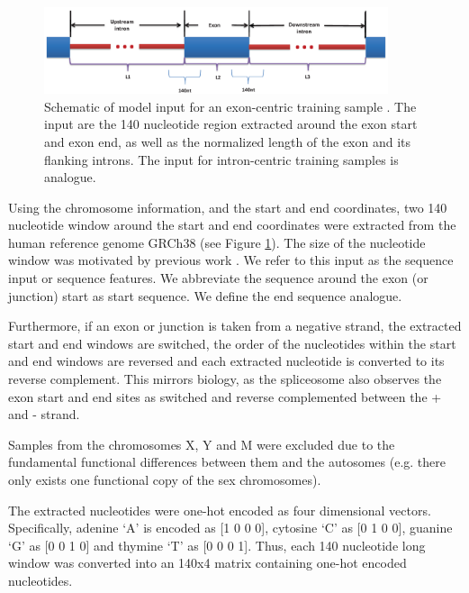 \begin{figure}
	\centering\includegraphics[width=0.9\textwidth]{../visualizations/ch4-methods/input_schematic.png} 
	\caption{Schematic of model input for an exon-centric training sample \cite{dsc}. The input are the 140 nucleotide region extracted around the exon start and exon end, as well as the normalized length of the exon and its flanking introns. The input for intron-centric training samples is analogue.}
	\label{fig:inputschematic}
\end{figure}

Using the chromosome information, and the start and end coordinates, two 140 nucleotide window around the start and end coordinates were extracted from the human reference genome GRCh38 (see Figure \ref{fig:inputschematic}). The size of the nucleotide window was motivated by previous work \cite{dsc}. We refer to this input as the sequence input or sequence features. We abbreviate the sequence around the exon (or junction) start as start sequence. We define the end sequence analogue. 

Furthermore, if an exon or junction is taken from a negative strand, the extracted start and end windows are switched, the order of the nucleotides within the start and end windows are reversed and each extracted nucleotide is converted to its reverse complement. This mirrors biology, as the spliceosome also observes the exon start and end sites as switched and reverse complemented between the + and - strand.

Samples from the chromosomes X, Y and M were excluded due to the fundamental functional differences between them and the autosomes (e.g. there only exists one functional copy of the sex chromosomes).

The extracted nucleotides were one-hot encoded as four dimensional vectors. Specifically, adenine `A' is encoded as [1 0 0 0], cytosine `C' as [0 1 0 0], guanine `G' as [0 0 1 0] and thymine `T' as [0 0 0 1]. Thus, each 140 nucleotide long window was converted into an 140x4 matrix containing one-hot encoded nucleotides. 

